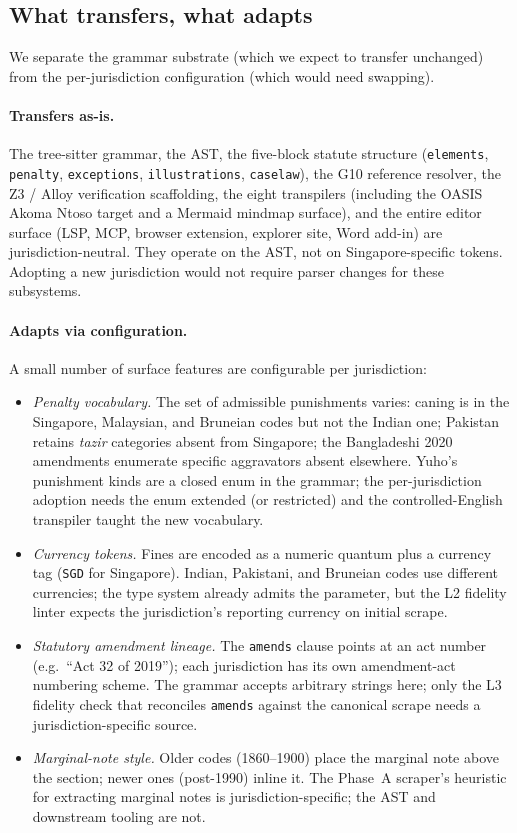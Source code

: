 \subsection{What transfers, what adapts}
\label{subsec:portability_mechanism}

We separate the grammar substrate (which we expect to transfer
unchanged) from the per-jurisdiction configuration (which would need
swapping).

\paragraph{Transfers as-is.} The tree-sitter grammar, the AST, the
five-block statute structure (\texttt{elements}, \texttt{penalty},
\texttt{exceptions}, \texttt{illustrations}, \texttt{caselaw}), the
G10 reference resolver, the Z3 / Alloy verification scaffolding, the
eight transpilers (including the OASIS Akoma Ntoso target and a Mermaid mindmap surface), and the entire editor surface (LSP, MCP, browser
extension, explorer site, Word add-in) are jurisdiction-neutral. They
operate on the AST, not on Singapore-specific tokens. Adopting a new
jurisdiction would not require parser changes for these subsystems.

\paragraph{Adapts via configuration.} A small number of surface
features are configurable per jurisdiction:

\begin{itemize}
\item \emph{Penalty vocabulary.} The set of admissible punishments
varies: caning is in the Singapore, Malaysian, and Bruneian codes
but not the Indian one; Pakistan retains \emph{tazir} categories
absent from Singapore; the Bangladeshi 2020 amendments enumerate
specific aggravators absent elsewhere. Yuho's punishment kinds are
a closed enum in the grammar; the per-jurisdiction adoption needs
the enum extended (or restricted) and the controlled-English
transpiler taught the new vocabulary.
\item \emph{Currency tokens.} Fines are encoded as a numeric quantum
plus a currency tag (\texttt{SGD} for Singapore). Indian, Pakistani,
and Bruneian codes use different currencies; the type system already
admits the parameter, but the L2 fidelity linter expects the
jurisdiction's reporting currency on initial scrape.
\item \emph{Statutory amendment lineage.} The \texttt{amends} clause
points at an act number (e.g.\ ``Act 32 of 2019''); each
jurisdiction has its own amendment-act numbering scheme. The grammar
accepts arbitrary strings here; only the L3 fidelity check that
reconciles \texttt{amends} against the canonical scrape needs a
jurisdiction-specific source.
\item \emph{Marginal-note style.} Older codes (1860--1900) place the
marginal note above the section; newer ones (post-1990) inline it.
The Phase~A scraper's heuristic for extracting marginal notes is
jurisdiction-specific; the AST and downstream tooling are not.
\end{itemize}


